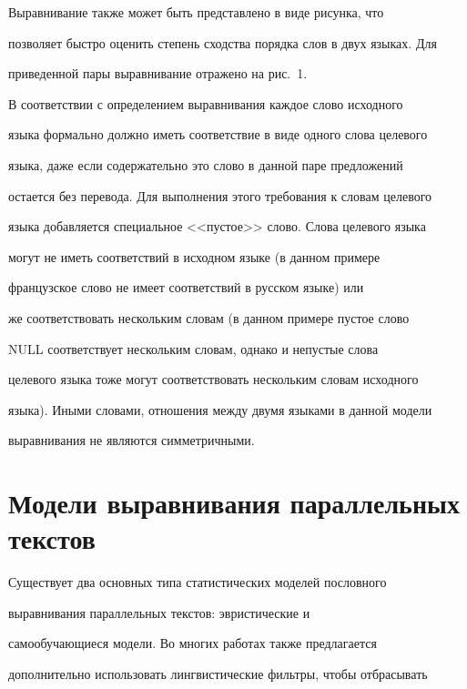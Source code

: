      Выравнивание также может быть представлено в виде рисунка, что


поз\-во\-ля\-ет быстро оценить степень сходства порядка слов в двух языках. Для


приведенной пары выравнивание отражено на рис.~1.











     В соответствии с определением выравнивания каждое слово исходного


языка формально должно иметь соответствие в виде одного слова целевого


языка, даже если содержательно это слово в данной паре предложений


остается без перевода. Для выполнения этого требования к словам целевого


языка добавляется специальное <<пустое>> слово. Слова целевого языка


могут не иметь соответствий в исходном языке (в данном примере


французское слово{} не имеет соответствий в русском языке) или


же соответствовать нескольким словам (в данном примере пустое слово


{NULL} соответствует нескольким словам, однако и непустые слова


целевого языка тоже могут соответствовать нескольким словам исходного


языка). Иными словами, отношения между двумя языками в данной модели


выравнивания не являются симметричными.





\section{Модели выравнивания параллельных текстов}





     Существует два основных типа статистических моделей пословного


выравнивания параллельных текстов: эвристические  и


самообучающиеся модели. Во многих работах также предлагается


дополнительно использовать лингвистические фильтры, чтобы отбрасывать


